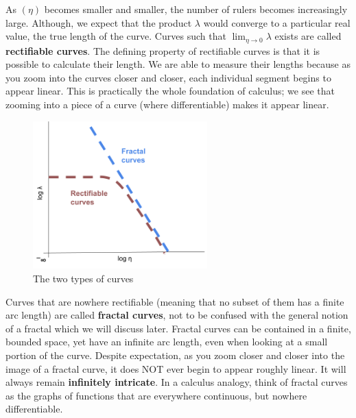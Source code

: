 As $(\eta)$ becomes smaller and smaller, the number of rulers becomes increasingly large. Although, we expect that the product $\lambda$ would converge to a particular real value, the true length of the curve. Curves such that $\displaystyle \lim_{\eta\to0}\lambda$ exists are called \textbf{rectifiable curves}. The defining property of rectifiable curves is that it is possible to calculate their length. We are able to measure their lengths because as you zoom into the curves closer and closer, each individual segment begins to appear linear. This is practically the whole foundation of calculus; we see that zooming into a piece of a curve (where differentiable) makes it appear linear. \\

\begin{figure}
  \begin{center}
    \includegraphics[width=0.6\textwidth]{Images/1.1.2.png}
  \end{center}
  \caption{The two types of curves}
\end{figure}

Curves that are nowhere rectifiable (meaning that no subset of them has a finite arc length) are called \textbf{fractal curves}, not to be confused with the general notion of a fractal which we will discuss later. Fractal curves can be contained in a finite, bounded space, yet have an infinite arc length, even when looking at a small portion of the curve. Despite expectation, as you zoom closer and closer into the image of a fractal curve, it does NOT ever begin to appear roughly linear. It will always remain \textbf{infinitely intricate}. In a calculus analogy, think of fractal curves as the graphs of functions that are everywhere continuous, but nowhere differentiable. \\

